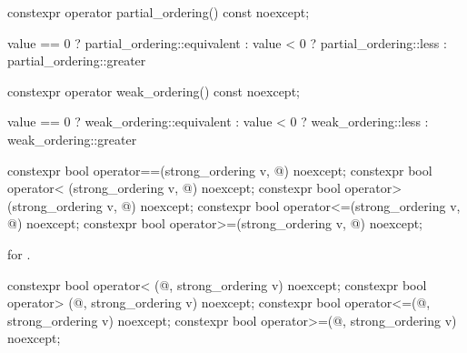 %
\begin{itemdecl}
constexpr operator partial_ordering() const noexcept;
\end{itemdecl}

\begin{itemdescr}
\pnum
\returns
\begin{codeblock}
value == 0 ? partial_ordering::equivalent :
value < 0  ? partial_ordering::less :
             partial_ordering::greater
\end{codeblock}
\end{itemdescr}

%
\begin{itemdecl}
constexpr operator weak_ordering() const noexcept;
\end{itemdecl}

\begin{itemdescr}
\pnum
\returns
\begin{codeblock}
value == 0 ? weak_ordering::equivalent :
value < 0  ? weak_ordering::less :
             weak_ordering::greater
\end{codeblock}
\end{itemdescr}

%
%
%
%
%
\begin{itemdecl}
constexpr bool operator==(strong_ordering v, @\unspec@) noexcept;
constexpr bool operator< (strong_ordering v, @\unspec@) noexcept;
constexpr bool operator> (strong_ordering v, @\unspec@) noexcept;
constexpr bool operator<=(strong_ordering v, @\unspec@) noexcept;
constexpr bool operator>=(strong_ordering v, @\unspec@) noexcept;
\end{itemdecl}

\begin{itemdescr}
\pnum
\returns
{} for .
\end{itemdescr}

%
%
%
%
\begin{itemdecl}
constexpr bool operator< (@\unspec@, strong_ordering v) noexcept;
constexpr bool operator> (@\unspec@, strong_ordering v) noexcept;
constexpr bool operator<=(@\unspec@, strong_ordering v) noexcept;
constexpr bool operator>=(@\unspec@, strong_ordering v) noexcept;
\end{itemdecl}

